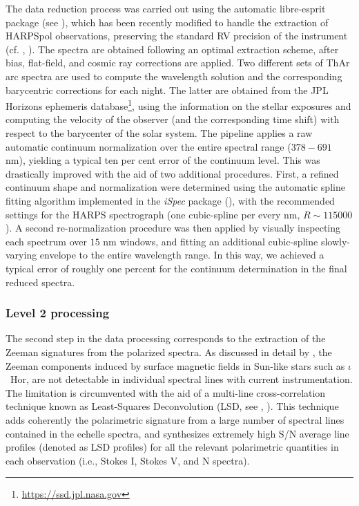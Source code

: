 \documentclass[a4paper,fleqn,usenatbib]{mnras}
\begin{document}
The data reduction process was carried out using the automatic {\sc libre-esprit} package (see ), which has been recently modified to handle the extraction of HARPSpol observations, preserving the standard RV precision of the instrument (cf. , ). The spectra are obtained following an optimal extraction scheme, after bias, flat-field, and cosmic ray corrections are applied. Two different sets of ThAr arc spectra are used to compute the wavelength solution and the corresponding barycentric corrections for each night. The latter are obtained from the JPL Horizons ephemeris database\footnote[5]{\url{https://ssd.jpl.nasa.gov}}, using the information on the stellar exposures and computing the velocity of the observer (and the corresponding time shift) with respect to the barycenter of the solar system. The pipeline applies a raw automatic continuum normalization over the entire spectral range ($378 - 691$ nm), yielding a typical ten per cent error of the continuum level. This was drastically improved with the aid of two additional procedures. First, a refined continuum shape and normalization were determined using the automatic spline fitting algorithm implemented in the \textit{iSpec} package (), with the recommended settings for the HARPS spectrograph (one cubic-spline per every nm, $R \sim 115000$). A second re-normalization procedure was then applied by visually inspecting each spectrum over $15$ nm windows, and fitting an additional cubic-spline slowly-varying envelope to the entire wavelength range. In this way, we achieved a typical error of roughly one percent for the continuum determination in the final reduced spectra.

\subsubsection{Level 2 processing}\label{lv2}

\noindent The second step in the data processing corresponds to the extraction of the Zeeman signatures from the polarized spectra. As discussed in detail by , the Zeeman components induced by surface magnetic fields in Sun-like stars such as $\iota$~Hor, are not detectable in individual spectral lines with current instrumentation. The limitation is circumvented with the aid of a multi-line cross-correlation technique known as Least-Squares Deconvolution (LSD, see , ). This technique adds coherently the polarimetric signature from a large number of spectral lines contained in the echelle spectra, and synthesizes extremely high S/N average line profiles (denoted as LSD profiles) for all the relevant polarimetric quantities in each observation (i.e., Stokes I, Stokes V, and N spectra). 
\end{document}
